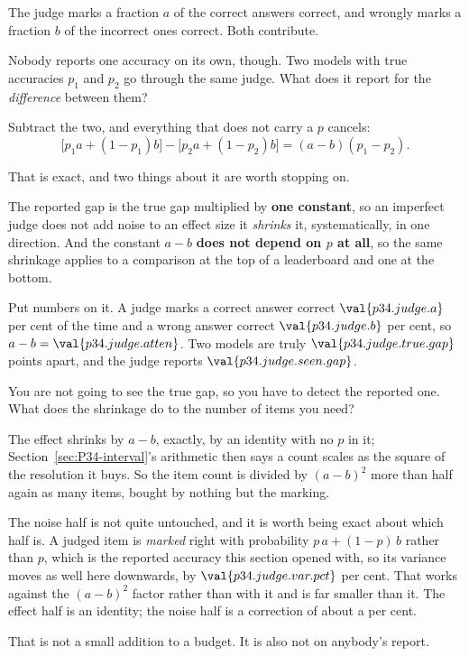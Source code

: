 \begin{fr}

The judge marks a fraction $a$ of the correct answers correct, and wrongly
marks a fraction $b$ of the incorrect ones correct. Both contribute.

Nobody reports one accuracy on its own, though. Two models with true
accuracies $p_{1}$ and $p_{2}$ go through the same judge. What does it
report for the \emph{difference} between them?
\dotline
\nextframe
\end{fr}

\begin{fr}
\begin{ansblock}
Subtract the two, and everything that does not carry a $p$ cancels:
\[ \bigl[p_{1}a + (1-p_{1})b\bigr] - \bigl[p_{2}a + (1-p_{2})b\bigr]
   = (a - b)(p_{1} - p_{2}) . \]
\end{ansblock}

That is exact, and two things about it are worth stopping on.

The reported gap is the true gap multiplied by \textbf{one constant}, so an
imperfect judge does not add noise to an effect size \dash{} it \emph{shrinks}
it, systematically, in one direction. And the constant $a - b$ \textbf{does
not depend on $p$ at all}, so the same shrinkage applies to a comparison at
the top of a leaderboard and one at the bottom.
\end{fr}

\begin{fr}
Put numbers on it. A judge marks a correct answer correct
$\val{p34.judge.a}$ per cent of the time and a wrong answer correct
$\val{p34.judge.b}$ per cent, so $a - b = \val{p34.judge.atten}$. Two models
are truly $\val{p34.judge.true.gap}$ points apart, and the judge reports
$\val{p34.judge.seen.gap}$.

You are not going to see the true gap, so you have to detect the reported
one. What does the shrinkage do to the number of items you need?
\dotline
\nextframe
\end{fr}

\begin{fr}

The effect shrinks by $a - b$, exactly, by an identity with no $p$ in it;
Section~\ref{sec:P34-interval}'s arithmetic then says a count scales as the
square of the resolution it buys. So the item count is divided by
$(a-b)^{2}$ \dash{} more than half again as many items, bought by nothing
but the marking.

The noise half is not quite untouched, and it is worth being exact about
which half is. A judged item is \emph{marked} right with probability
$p\,a + (1-p)\,b$ rather than $p$, which is the reported accuracy this
section opened with, so its variance moves as well \dash{} here downwards, by
$\val{p34.judge.var.pct}$ per cent. That works against the $(a-b)^{2}$
factor rather than with it and is far smaller than it. The effect half is an
identity; the noise half is a correction of about a per cent.

That is not a small addition to a budget. It is also not on anybody's
report.
\end{fr}

